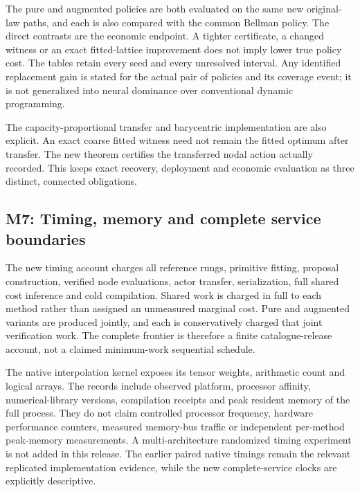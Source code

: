 \documentclass[ecta,nameyear,draft]{econsocart}
\begin{document}
The pure and augmented policies are both evaluated on the same new
original-law paths, and each is also compared with the common Bellman
policy. The direct contrasts are the economic endpoint. A tighter
certificate, a changed witness or an exact fitted-lattice improvement
does not imply lower true policy cost. The tables retain every seed and
every unresolved interval. Any identified replacement gain is stated for
the actual pair of policies and its coverage event; it is not
generalized into neural dominance over conventional dynamic programming.

The capacity-proportional transfer and barycentric implementation are
also explicit. An exact coarse fitted witness need not remain the fitted
optimum after transfer. The new theorem certifies the transferred nodal
action actually recorded. This keeps exact recovery, deployment and
economic evaluation as three distinct, connected obligations.

\hypertarget{m7-timing-memory-and-complete-service-boundaries}{%
\subsection{M7: Timing, memory and complete service
boundaries}\label{m7-timing-memory-and-complete-service-boundaries}}

The new timing account charges all reference rungs, primitive fitting,
proposal construction, verified node evaluations, actor transfer,
serialization, full shared cost inference and cold compilation. Shared
work is charged in full to each method rather than assigned an
unmeasured marginal cost. Pure and augmented variants are produced
jointly, and each is conservatively charged that joint verification
work. The complete frontier is therefore a finite catalogue-release
account, not a claimed minimum-work sequential schedule.

The native interpolation kernel exposes its tensor weights, arithmetic
count and logical arrays. The records include observed platform,
processor affinity, numerical-library versions, compilation receipts and
peak resident memory of the full process. They do not claim controlled
processor frequency, hardware performance counters, measured memory-bus
traffic or independent per-method peak-memory measurements. A
multi-architecture randomized timing experiment is not added in this
release. The earlier paired native timings remain the relevant
replicated implementation evidence, while the new complete-service
clocks are explicitly descriptive.
\end{document}

